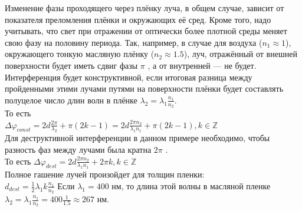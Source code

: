 ﻿\documentclass[__main__.tex]{subfiles}
\begin{document}
Изменение фазы проходящего через плёнку луча, в общем случае, зависит от показателя преломления плёнки и окружающих её сред. Кроме того, надо учитывать, что свет при отражении от оптически более плотной среды меняет свою фазу на половину периода. Так, например, в случае для воздуха ($n_1 ≈ 1$), окружающего тонкую масляную плёнку ($n_2 ≈ 1.5$), луч, отражённый от внешней поверхности будет иметь сдвиг фазы $\pi$ , а от внутренней — не будет. Интерференция будет конструктивной, если итоговая разница между пройденными этими лучами путями на поверхности плёнки будет составлять полуцелое число длин волн в плёнке $\lambda_2 = \lambda_1\frac{n_1}{n_2}$.\\
То есть\\
${\displaystyle \Delta \varphi _{const}=2d{\frac {2\pi }{\lambda _{2}}}+\pi (2k-1)=2d{\frac {2\pi n_{2}}{\lambda _{1}n_{1}}}+\pi (2k-1),k\in \mathbb {Z} }$\\ 
Для деструктивной интерференции в данном примере необходимо, чтобы разность фаз между лучами была кратна $2\pi$ .\\
То есть ${\displaystyle \Delta \varphi _{dest}=2d{\frac {2\pi n_{2}}{\lambda _{1}n_{1}}}+2\pi k,k\in \mathbb {Z} }$ \\
Полное гашение лучей произойдет для толщин пленки:\\
${\displaystyle d_{dest}={\frac {1}{2}}\lambda _{1}k{\frac {n_{1}}{n_{2}}}}$ 
Если ${\displaystyle \lambda _{1}=400}$ нм, то длина этой волны в масляной пленке ${\displaystyle \lambda _{2}=\lambda _{1}{\frac {n_{1}}{n_{2}}}=400{\frac {1}{1.5}}\approx 267}$ нм.
\end{document}

